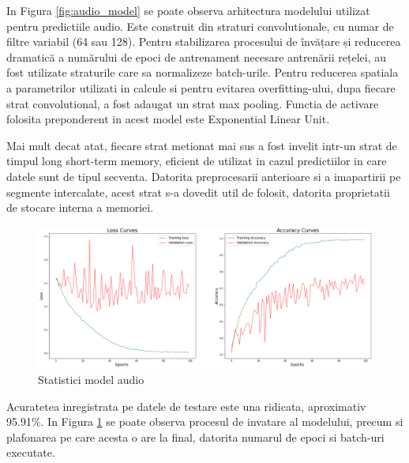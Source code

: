 \documentclass[a4paper, 12pt]{report}
\begin{document}
	In Figura \ref{fig:audio_model} se poate observa arhitectura modelului utilizat pentru predictiile audio. Este construit din straturi convolutionale, cu numar de filtre variabil (64 sau 128). Pentru stabilizarea procesului de învățare și reducerea dramatică a numărului de epoci de antrenament necesare antrenării rețelei, au fost utilizate straturile care sa normalizeze batch-urile. Pentru reducerea spatiala a parametrilor utilizati in calcule si pentru evitarea overfitting-ului, dupa fiecare strat convolutional, a fost adaugat un strat max pooling. Functia de activare folosita preponderent in acest model este Exponential Linear Unit.
	
	Mai mult decat atat, fiecare strat metionat mai sus a fost invelit intr-un strat de timpul long short-term memory, eficient de utilizat in cazul predictiilor in care datele sunt de tipul secventa. Datorita preprocesarii anterioare si a imapartirii pe segmente intercalate, acest strat s-a dovedit util de folosit, datorita proprietatii de stocare interna a memoriei.
	
	\begin{figure}[H]
		\begin{center}
			\includegraphics[scale=0.2]{images/accuracy_audio_model.png}
		\end{center}
		\caption{Statistici model audio}
		\label{fig:audio_model_accuracy}
	\end{figure}
	
	Acuratetea inregistrata pe datele de testare este una ridicata, aproximativ 95.91\%. In Figura \ref{fig:audio_model_accuracy} se poate observa procesul de invatare al modelului, precum si plafonarea pe care acesta o are la final, datorita numarul de epoci si batch-uri executate.
	
\end{document}
